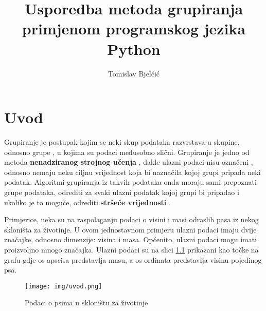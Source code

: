 \documentclass[times, utf8, zavrsni]{fer}
\begin{document}

\title{Usporedba metoda grupiranja primjenom programskog jezika Python}

\author{Tomislav Bjelčić}

\maketitle

\izvornik

\zahvala{}

\tableofcontents

\chapter{Uvod}

Grupiranje  je postupak kojim se neki skup podataka razvrstava u skupine, odnosno grupe , u kojima su podaci međusobno slični. Grupiranje je jedno od metoda \textbf{nenadziranog strojnog učenja} , dakle ulazni podaci nisu označeni , odnosno nemaju neku ciljnu vrijednost koja bi naznačila kojoj grupi pripada neki podatak. Algoritmi grupiranja iz takvih podataka onda moraju sami prepoznati grupe podataka, odrediti za svaki ulazni podatak kojoj grupi bi pripadao i ukoliko je to moguće, odrediti \textbf{stršeće vrijednosti} .

Primjerice, neka su na raspolaganju podaci o visini i masi odraslih pasa iz nekog 
skloništa za životinje. U ovom jednostavnom primjeru ulazni podaci imaju dvije značajke, odnosno dimenzije: visina i masa. Općenito, ulazni podaci mogu imati proizvoljno mnogo značajka. Ulazni podaci su na slici \ref{fig:intro} prikazani kao točke na grafu gdje os apscisa predstavlja masu, a os ordinata predstavlja visinu pojedinog psa.

\begin{figure}[H]
    \centering
    \texttt{[image: img/uvod.png]}
    \caption{Podaci o psima u skloništu za životinje}
    \label{fig:intro}
\end{figure}
\end{document}
